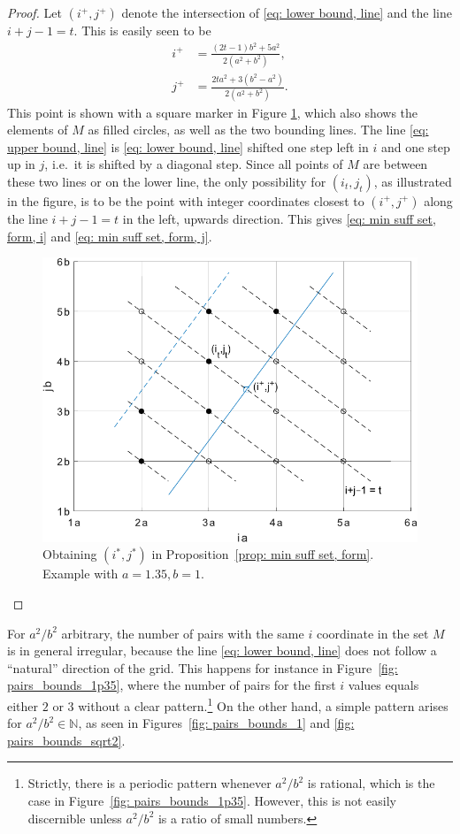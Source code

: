 \documentclass[12pt, a4paper]{article}
\newcommand{\tiles}{t} %
\newcommand{\isolr}{i^+}
\newcommand{\jsolr}{j^+}
\newcommand{\isoli}{i^\ast}
\newcommand{\jsoli}{j^\ast}
\newcommand{\mss}{M}
\begin{document}
\begin{proof}
Let $(\isolr, \jsolr)$ denote the intersection of \eqref{eq: lower bound, line} and the line $i+j-1=\tiles$. This is easily seen to be
\begin{align}
\label{eq: min suff set, form, isolr}
\isolr &= \frac {(2\tiles-1)b^2+5a^2}{2(a^2+b^2)}, \\
\label{eq: min suff set, form, jsolr}
\jsolr &= \frac {2\tiles a^2 + 3(b^2-a^2)}{2(a^2+b^2)}. 
\end{align}
This point is shown with a square marker in Figure \ref{fig: ijLS_1p35_detail_inverse}, which also shows the elements of $\mss$ as filled circles, as well as the two bounding lines. The line \eqref{eq: upper bound, line} is \eqref{eq: lower bound, line} shifted one step left in $i$ and one step up in $j$, i.e.~it is shifted by a diagonal step. Since all points of $\mss$ are between these two lines or on the lower line, the only possibility for $(i_\tiles,j_\tiles)$, as illustrated in the figure, is to be the point with integer coordinates closest to $(\isolr,\jsolr)$ along the line $i+j-1=\tiles$ in the left, upwards direction. This gives \eqref{eq: min suff set, form, i} and \eqref{eq: min suff set, form, j}.

\begin{figure}%
\centering%
\includegraphics[width=.7\textwidth]{ijLS_1p35_detail_inverse}%
\caption{Obtaining $(\isoli,\jsoli)$ in Proposition~\ref{prop: min suff set, form}. Example with $a=1.35, b=1$.%
}%
\label{fig: ijLS_1p35_detail_inverse}%
\end{figure}%
\end{proof}
 
For $a^2/b^2$ arbitrary, the number of pairs with the same $i$ coordinate in the set $\mss$ is in general irregular, because the line \eqref{eq: lower bound, line} does not follow a ``natural'' direction of the grid. This happens for instance in Figure~\ref{fig: pairs_bounds_1p35}, where the number of pairs for the first $i$ values equals either $2$ or $3$ without a clear pattern.\footnote{Strictly, there is a periodic pattern whenever $a^2/b^2$ is rational, which is the case in Figure~\ref{fig: pairs_bounds_1p35}. However, this is not easily discernible unless $a^2/b^2$ is a ratio of small numbers.}
On the other hand, a simple pattern arises for $a^2/b^2 \in \mathbb N$, as seen in Figures~\ref{fig: pairs_bounds_1} and \ref{fig: pairs_bounds_sqrt2}.
\end{document}
